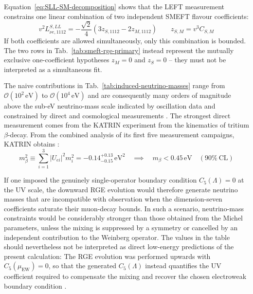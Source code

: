 Equation~\ref{eq:SLL-SM-decomposition} shows that the LEFT measurement
constrains one linear combination of two independent SMEFT flavour
coefficients:
\begin{equation}
     v^2L_{\nu e,1112}^{S,LL}
    =-\frac{\sqrt2}{4}
   \left(3z_{S,1112}-2z_{M,1112}\right)
    \qquad z_{S,M}=v^3C_{S,M}
\end{equation}
If both coefficients are allowed simultaneously, only this combination
is bounded. The two rows in Tab.~\ref{tab:smeft-rge-primary} instead
represent the mutually exclusive one-coefficient hypotheses
\(z_M=0\) and \(z_S=0\) -- they must not be interpreted as a simultaneous
fit. \par 
The naive contributions in Tab.~\ref{tab:induced-neutrino-masses}
range from $\mathcal{O}(10^2\,\mathrm{eV})$ to
$\mathcal{O}(10^4\,\mathrm{eV})$ and are consequently many orders of
magnitude above the sub-eV neutrino-mass scale indicated by oscillation
data and constrained by direct and cosmological measurements
\parencite{particle2024review}. The strongest direct measurement comes from the KATRIN experiment from the kinematics of tritium $\beta$-decay. From the combined analysis of its first five measurement campaigns, KATRIN obtains \cite{katrin2025direct}:
\begin{equation}
    m_\beta^2
    \equiv \sum_{i=1}^{3}\lvert U_{ei}\rvert^2m_i^2
    =-0.14^{+0.13}_{-0.15}\,\mathrm{eV}^2
    \quad\implies\quad
    m_\beta<0.45\,\mathrm{eV}
    \quad (90\%~\mathrm{CL})
\end{equation}

If one imposed the genuinely
single-operator boundary condition $C_5(\Lambda)=0$ at the UV scale,
the downward RGE evolution would therefore generate neutrino masses
that are incompatible with observation when the dimension-seven
coefficients saturate their muon-decay bounds. In such a scenario,
neutrino-mass constraints would be considerably stronger than those
obtained from the Michel parameters, unless the mixing is suppressed by
a symmetry or cancelled by an independent contribution to the Weinberg
operator. The values in the table should nevertheless not be interpreted
as direct low-energy predictions of the present calculation: The RGE
evolution was performed upwards with $C_5(\mu_{\mathrm{EW}})=0$, so that
the generated $C_5(\Lambda)$ instead quantifies the UV coefficient
required to compensate the mixing and recover the chosen electroweak
boundary condition \parencite{liao2025rge}.
